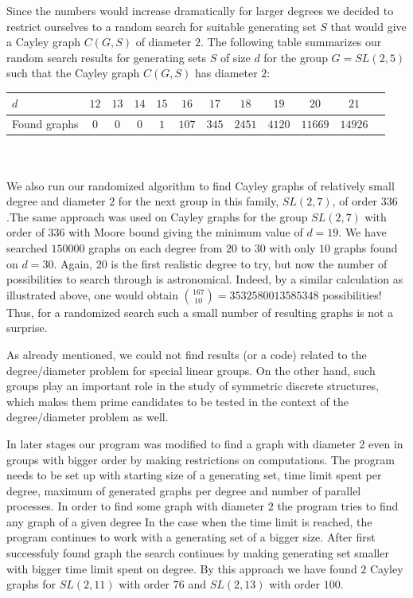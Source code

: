 \documentclass[a4paper,12pt,oneside]{report}%
\begin{document}
Since the numbers would increase dramatically for larger degrees we decided to restrict ourselves to a random search for suitable generating set $S$ that would give     a Cayley graph $C(G,S)$ of diameter $2$. The following table summarizes our random search results for generating sets $S$ of size $d$ for the group $G=SL(2,5)$ such     that the Cayley graph $C(G,S)$ has diameter $2$: ~ \\

\begin{tabular}[htbp]{l*{10}{c}r}
     $d$ & $12$ & $13$ & $14$ & $15$ & $16$ & $17$ & $18$ & $19$ & $20$ & $21$ \\
\hline
     Found graphs & $0$ & $0$  & $0$ & $1$ & $107$ & $345$ & $2451$  & $4120$ & $11669$ & $14926$ \\
\end{tabular} \\ \\

 We also run our randomized algorithm to find Cayley graphs of relatively small degree and diameter $2$ for the next group in this family, $SL(2,7)$, of order $336$.The same approach was used on Cayley graphs for the group $SL(2,7)$ with order of $336$ with Moore bound giving the minimum value of $d=19$. We have searched $150000$ graphs on each degree from $20$ to $30$ with only $10$ graphs found on $d=30$. Again, $20$ is the first realistic degree to try, but now the number of possibilities to search through is astronomical. Indeed, by a similar calculation as illustrated above, one would obtain ${167\choose 10} = 3532580013585348$ possibilities! Thus, for a randomized search such a small number of resulting graphs is not a surprise.

As already mentioned, we could not find results (or a code) related to the degree/diameter problem for special linear groups. On the other hand, such groups play an     important role in the study of symmetric discrete structures, which makes them prime candidates to be tested in the context of the degree/diameter problem as well.

In later stages our program was modified to find a graph with diameter 2 even in groups with bigger order by making restrictions on computations. The program needs to be set up with starting size of a generating set, time limit spent per degree, maximum of generated graphs per degree and number of parallel processes. In order to find some graph with diameter $2$ the program tries to find any graph of a given  degree In the case when the time limit is reached, the program continues to work with a generating set of a bigger size. After first successfuly found graph the search continues by making generating set smaller with bigger time limit spent on degree.
By this approach we have found $2$ Cayley graphs for $SL(2,11)$ with order $76$ and $SL(2,13)$ with order $100$. 
\end{document}
